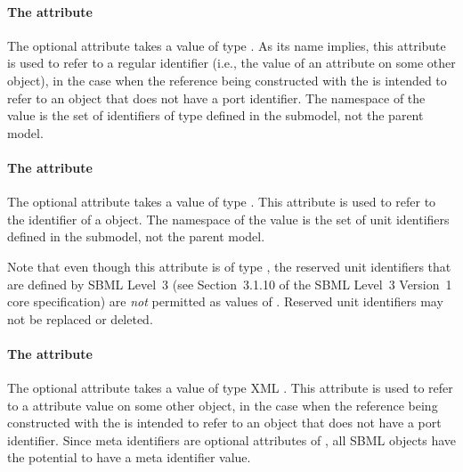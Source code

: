 \paragraph{The \hspace*{1pt} attribute}
\label{sbaseref-idref}

The optional attribute  takes a value of type
.  As its name implies, this attribute is used to
refer to a regular identifier (i.e., the value of an 
attribute on some other object), in the case when the reference being
constructed with the \SBaseRef is intended to refer to an object that
does not have a port identifier.  The namespace of the 
value is the set of identifiers of type  defined in the
submodel, not the parent model.


\paragraph{The \hspace*{1pt} attribute}
\label{sbaseref-unitref}

The optional attribute  takes a value of type
.  This attribute is used to refer to the identifier
of a \UnitDefinition object.  The namespace of the 
value is the set of unit identifiers defined in the submodel, not the
parent model.

Note that even though this attribute is of type ,
the reserved unit identifiers that are defined by SBML Level~3 (see
Section~3.1.10 of the SBML Level~3 Version~1 core specification) are
\emph{not} permitted as values of .  Reserved unit
identifiers may not be replaced or deleted.


\paragraph{The \hspace*{1pt} attribute}
\label{sbaseref-metaidref}

The optional attribute  takes a value of type XML
.  This attribute is used to refer to a 
attribute value on some other object, in the case when the reference
being constructed with the \SBaseRef is intended to refer to an object
that does not have a port identifier.  Since meta identifiers are
optional attributes of \SBase, all SBML objects have the potential to
have a meta identifier value.

